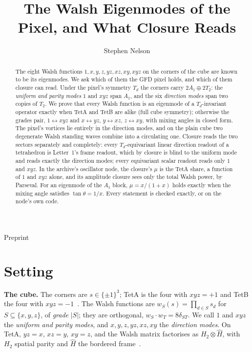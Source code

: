 \documentclass[twocolumn]{iopjournal}
\renewcommand{\articletype}[1]{%
  {\vspace*{-8mm}\noindent \Large \sf Preprint}\par
  \vspace*{6mm}\noindent{\scriptsize \sf{\bfseries \MakeUppercase{#1}}}}
\theoremstyle{definition}
\theoremstyle{remark}
\begin{document}
\articletype{Proof}

\title{The Walsh Eigenmodes of the Pixel, and What Closure Reads}

\author{Stephen Nelson}



\begin{abstract}
The eight Walsh functions $1, x, y, z, yz, xz, xy, xyz$ on the corners of
the cube are known to be its eigenmodes. We ask which of them the GFD
pixel holds, and which of them closure can read. Under the pixel's
symmetry $T_d$ the corners carry $2A_1 \oplus 2T_2$: the \emph{uniform and
parity modes} $1$ and $xyz$ span $A_1$, and the six \emph{direction modes}
span two copies of $T_2$. We prove that every Walsh function is an
eigenmode of a $T_d$-invariant operator exactly when TetA and TetB are
alike (full cube symmetry); otherwise the grades pair, $1 \leftrightarrow
xyz$ and $x \leftrightarrow yz$, $y \leftrightarrow xz$, $z \leftrightarrow
xy$, with mixing angles in closed form. The pixel's vortices lie entirely
in the direction modes, and on the plain cube two degenerate Walsh
standing waves combine into a circulating one. Closure reads the two
sectors separately and completely: every $T_d$-equivariant linear
direction readout of a tetrahedron is Letter~1's frame readout, which by
closure is blind to the uniform mode and reads exactly the direction
modes; every equivariant scalar readout reads only $1$ and $xyz$. In the
archive's oscillator node, the closure's $\mu$ is the TetA share, a
function of $1$ and $xyz$ alone, and its amplitude closure sees only the
total Walsh power, by Parseval. For an eigenmode of the $A_1$ block,
$\mu = x/(1+x)$ holds exactly when the mixing angle satisfies
$\tan\theta = 1/x$. Every statement is checked exactly, or on the node's
own code.
\end{abstract}



\section*{Setting}

\textbf{The cube.} The corners are $s \in \{\pm1\}^3$; TetA is the four
with $xyz = +1$ and TetB the four with $xyz = -1$~\cite{NelsonHadamard}.
The Walsh functions are $w_S(s) = \prod_{d\in S}s_d$ for
$S \subseteq \{x, y, z\}$, of \emph{grade} $\lvert S\rvert$; they are
orthogonal, $w_S\cdot w_T = 8\delta_{ST}$. We call $1$ and $xyz$ the
\emph{uniform and parity modes}, and $x, y, z, yz, xz, xy$ the
\emph{direction modes}. On TetA, $yz = x$, $xz = y$, $xy = z$, and the
Walsh matrix factorises as $H_2 \otimes \hat H$, with $H_2$ spatial
parity and $\hat H$ the bordered frame~\cite{NelsonHadamard}.
\end{document}
